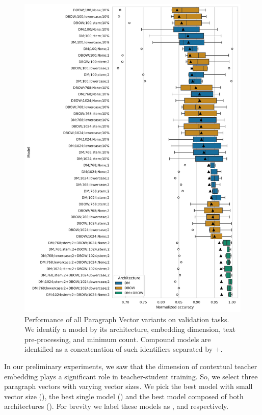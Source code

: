 \begin{figure}

    \includegraphics[width=\textwidth]{./img/pv_val_scores.pdf}

    \caption{Performance of all Paragraph Vector variants on validation tasks.
    We identify a model by its architecture, embedding dimension, text
    pre-processing, and minimum count. Compound models are identified as a
    concatenation of such identifiers separated by $+$.}

    \label{fig:pv_val_scores}

\end{figure}

In our preliminary experiments, we saw that the dimension of contextual teacher
embedding plays a significant role in teacher-student training. So, we select
three paragraph vectors with varying vector sizes. We pick the best model with
small vector size (), the best single model
() and the best model composed of both architectures
(). For brevity we label these models as
,  and  respectively.

